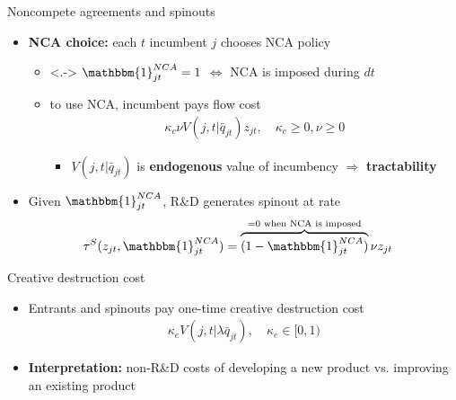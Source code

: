 \documentclass[english,usenames,dvipsnames]{beamer}
\begin{document}
\begin{frame}{Noncompete agreements and spinouts}
	\begin{itemize}
		\item<+-> \alert{\textbf{NCA choice:}} each $t$ incumbent $j$ chooses NCA policy
		\begin{itemize}
			\item<.-> $\mathbbm{1}^{NCA}_{jt} = 1$ $\Leftrightarrow$ NCA is imposed during $dt$
			\item<+-> to use NCA, incumbent pays flow cost 
			\begin{align*}
				 \kappa_c \nu V(j,t | \bar{q}_{jt}) z_{jt}, \quad \kappa_c \ge 0, \nu \ge 0
			\end{align*}
			\vspace{-17pt} 
			\begin{itemize}
				\item<+-> $V(j,t|\bar{q}_{jt})$ is \alert{\textbf{endogenous}} value of incumbency $\Rightarrow$ \alert{\textbf{tractability}} 
			\end{itemize}
		\end{itemize}
		\bigskip
		\item<+-> Given $\mathbbm{1}^{NCA}_{jt}$, R\&D generates spinout at rate
		\begin{align*}
		\tau^S(z_{jt},\mathbbm{1}^{NCA}_{jt}) &= \overbrace{(1-\mathbbm{1}_{jt}^{NCA})}^{\mathclap{= 0 \text{ when NCA is imposed}}} \nu z_{jt}
		\end{align*}
	\end{itemize}
\end{frame}

\begin{frame}{Creative destruction cost}
	\begin{itemize}
		\item Entrants and spinouts pay one-time creative destruction cost
		\begin{align*}
			\kappa_e V(j,t|\lambda \bar{q}_{jt}), \quad \kappa_e \in [0,1)
		\end{align*}
		\smallskip
		\item \alert{\textbf{Interpretation:}} non-R\&D costs of developing a new product vs. improving an existing product
	\end{itemize}
\end{frame}
\end{document}
